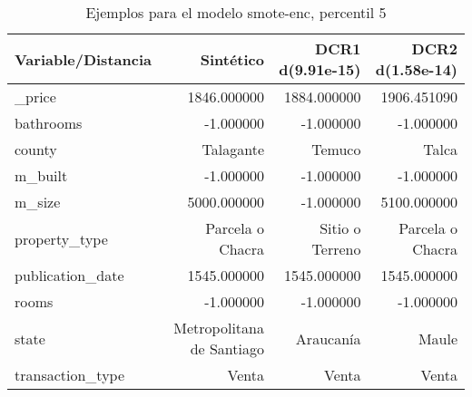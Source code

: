 \begin{table}[H]
\centering
\fontsize{10}{14}\selectfont
\caption{Ejemplos para el modelo smote-enc, percentil 5}
\label{table-example-economicos-b-3-smote-enc-5p}
\begin{tabular}{|l|r|r|r|}
\hline
\rowcolor[gray]{0.8}
Variable/Distancia & Sintético & DCR1 d(9.91e-15) & DCR2 d(1.58e-14) \\
\hline \_price & \cellcolor[rgb]{0.9, 0.54, 0.52} 1846.000000 & 1884.000000 & 1906.451090 \\
\hline bathrooms & \cellcolor[rgb]{0.9, 0.54, 0.52} -1.000000 & \cellcolor[rgb]{0.9, 0.54, 0.52} -1.000000 & \cellcolor[rgb]{0.9, 0.54, 0.52} -1.000000 \\
\hline county & \cellcolor[rgb]{0.9, 0.54, 0.52} Talagante & Temuco & Talca \\
\hline m\_built & \cellcolor[rgb]{0.9, 0.54, 0.52} -1.000000 & \cellcolor[rgb]{0.9, 0.54, 0.52} -1.000000 & \cellcolor[rgb]{0.9, 0.54, 0.52} -1.000000 \\
\hline m\_size & \cellcolor[rgb]{0.9, 0.54, 0.52} 5000.000000 & -1.000000 & 5100.000000 \\
\hline property\_type & \cellcolor[rgb]{0.9, 0.54, 0.52} Parcela o Chacra & Sitio o Terreno & \cellcolor[rgb]{0.9, 0.54, 0.52} Parcela o Chacra \\
\hline publication\_date & \cellcolor[rgb]{0.9, 0.54, 0.52} 1545.000000 & \cellcolor[rgb]{0.9, 0.54, 0.52} 1545.000000 & \cellcolor[rgb]{0.9, 0.54, 0.52} 1545.000000 \\
\hline rooms & \cellcolor[rgb]{0.9, 0.54, 0.52} -1.000000 & \cellcolor[rgb]{0.9, 0.54, 0.52} -1.000000 & \cellcolor[rgb]{0.9, 0.54, 0.52} -1.000000 \\
\hline state & \cellcolor[rgb]{0.9, 0.54, 0.52} Metropolitana de Santiago & Araucanía & Maule \\
\hline transaction\_type & \cellcolor[rgb]{0.9, 0.54, 0.52} Venta & \cellcolor[rgb]{0.9, 0.54, 0.52} Venta & \cellcolor[rgb]{0.9, 0.54, 0.52} Venta \\
\hline
\end{tabular}
\end{table}
